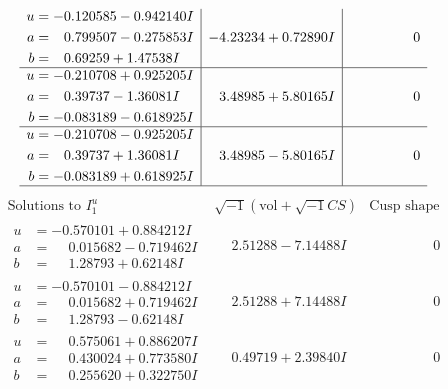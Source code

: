 \documentclass[1p]{elsarticle_modified}
\theoremstyle{definition}
\newcommand{\I}{\sqrt{-1}}
\begin{document}
$$\begin{array}{c|c|c}
\begin{aligned}
u &= -0.120585 - 0.942140 I \\
a &= \phantom{-}0.799507 - 0.275853 I \\
b &= \phantom{-}0.69259 + 1.47538 I\end{aligned}
 & -4.23234 + 0.72890 I & \phantom{-0.000000 } 0 \\ \hline\begin{aligned}
u &= -0.210708 + 0.925205 I \\
a &= \phantom{-}0.39737 - 1.36081 I \\
b &= -0.083189 - 0.618925 I\end{aligned}
 & \phantom{-}3.48985 + 5.80165 I & \phantom{-0.000000 } 0 \\ \hline\begin{aligned}
u &= -0.210708 - 0.925205 I \\
a &= \phantom{-}0.39737 + 1.36081 I \\
b &= -0.083189 + 0.618925 I\end{aligned}
 & \phantom{-}3.48985 - 5.80165 I & \phantom{-0.000000 } 0\\
 \hline 
 \end{array}$$\newpage$$\begin{array}{c|c|c}  
\text{Solutions to }I^u_{1}& \I (\text{vol} + \sqrt{-1}CS) & \text{Cusp shape}\\
 \hline 
\begin{aligned}
u &= -0.570101 + 0.884212 I \\
a &= \phantom{-}0.015682 - 0.719462 I \\
b &= \phantom{-}1.28793 + 0.62148 I\end{aligned}
 & \phantom{-}2.51288 - 7.14488 I & \phantom{-0.000000 } 0 \\ \hline\begin{aligned}
u &= -0.570101 - 0.884212 I \\
a &= \phantom{-}0.015682 + 0.719462 I \\
b &= \phantom{-}1.28793 - 0.62148 I\end{aligned}
 & \phantom{-}2.51288 + 7.14488 I & \phantom{-0.000000 } 0 \\ \hline\begin{aligned}
u &= \phantom{-}0.575061 + 0.886207 I \\
a &= \phantom{-}0.430024 + 0.773580 I \\
b &= \phantom{-}0.255620 + 0.322750 I\end{aligned}
 & \phantom{-}0.49719 + 2.39840 I & \phantom{-0.000000 } 0 \\ \hline\begin{aligned}

\end{aligned}
\end{array}$$
\end{document}

